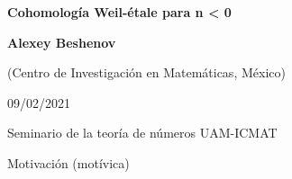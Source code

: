 \documentclass[handout]{beamer}
\begin{document}

\begin{frame}[noframenumbering]
  \begin{center}
    {\LARGE\bf Cohomología Weil-étale para n < 0

    }

    \vspace{3em}

    {\large\bf Alexey Beshenov}

    \vspace{1em}

    {\small (Centro de Investigación en Matemáticas, México)}

    \vspace{3em}

    09/02/2021

    \vspace{1em}

    Seminario de la teoría de números UAM-ICMAT

  \end{center}
\end{frame}


\begin{frame}[plain]
  \headingfont

  \begin{center}
    {\huge Motivación (motívica)}
  \end{center}
\end{frame}

\end{document}
